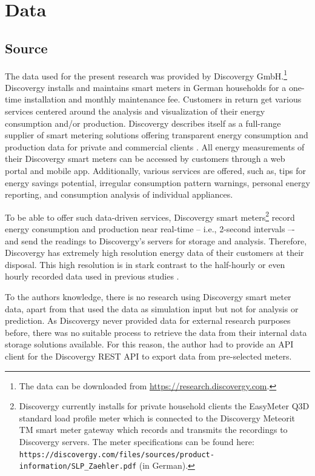 
\section{Data}\label{Sec:Data}




\subsection{Source}\label{Sec:Data;Subsec:Source}

The data used for the present research was provided by Discovergy GmbH.\footnote{The data can be downloaded from \href{https://research.discovergy.com}{https://research.discovergy.com}.} Discovergy installs and maintains smart meters in German households for a one-time installation and monthly maintenance fee. Customers in return get various services centered around the analysis and visualization of their energy consumption and/or production. Discovergy describes itself as a full-range supplier of smart metering solutions offering transparent energy consumption and production data for private and commercial clients \citep{Discovergy:2018}. All energy measurements of their Discovergy smart meters can be accessed by customers through a web portal and mobile app. Additionally, various services are offered, such as, tips for energy savings potential, irregular consumption pattern warnings, personal energy reporting, and consumption analysis of individual appliances.

To be able to offer such data-driven services, Discovergy smart meters\footnote{Discovergy currently installs for private household clients the EasyMeter Q3D standard load profile meter which is connected to the Discovergy Meteorit TM smart meter gateway which records and transmits the recordings to Discovergy servers. The meter specifications can be found here: \texttt{https://discovergy.com/files/sources/product-information/SLP\_Zaehler.pdf} (in German).} record energy consumption and production near real-time -- i.e., 2-second intervals –- and send the readings to Discovergy's servers for storage and analysis. Therefore, Discovergy has extremely high resolution energy data of their customers at their disposal. This high resolution is in stark contrast to the half-hourly or even hourly recorded data used in previous studies \cite[e.g.,][]{Arora:2016,Auder:2018,Shi:2017,Gerossier:2017}.

To the authors knowledge, there is no research using Discovergy smart meter data, apart from \cite{Teixeira:2017} that used the data as simulation input but not for analysis or prediction. As Discovergy never provided data for external research purposes before, there was no suitable process to retrieve the data from their internal data storage solutions available. For this reason, the author had to provide an API client for the Discovergy REST API to export data from pre-selected meters.


